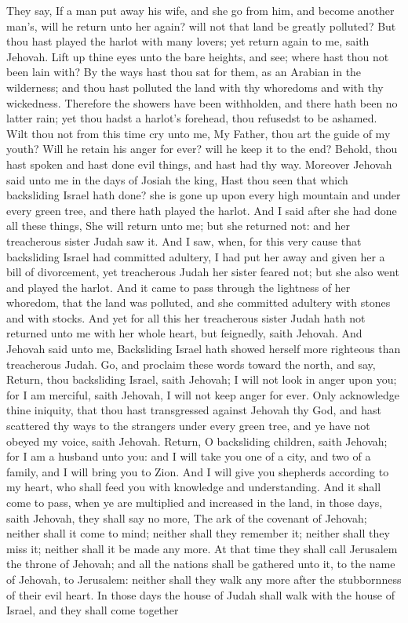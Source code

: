 They say, If a man put away his wife, and she go from him, and become another man’s, will he return unto her again? will not that land be greatly polluted? But thou hast played the harlot with many lovers; yet return again to me, saith Jehovah. Lift up thine eyes unto the bare heights, and see; where hast thou not been lain with? By the ways hast thou sat for them, as an Arabian in the wilderness; and thou hast polluted the land with thy whoredoms and with thy wickedness. Therefore the showers have been withholden, and there hath been no latter rain; yet thou hadst a harlot’s forehead, thou refusedst to be ashamed. Wilt thou not from this time cry unto me, My Father, thou art the guide of my youth? Will he retain his anger for ever? will he keep it to the end? Behold, thou hast spoken and hast done evil things, and hast had thy way.  Moreover Jehovah said unto me in the days of Josiah the king, Hast thou seen that which backsliding Israel hath done? she is gone up upon every high mountain and under every green tree, and there hath played the harlot. And I said after she had done all these things, She will return unto me; but she returned not: and her treacherous sister Judah saw it. And I saw, when, for this very cause that backsliding Israel had committed adultery, I had put her away and given her a bill of divorcement, yet treacherous Judah her sister feared not; but she also went and played the harlot. And it came to pass through the lightness of her whoredom, that the land was polluted, and she committed adultery with stones and with stocks. And yet for all this her treacherous sister Judah hath not returned unto me with her whole heart, but feignedly, saith Jehovah.  And Jehovah said unto me, Backsliding Israel hath showed herself more righteous than treacherous Judah. Go, and proclaim these words toward the north, and say, Return, thou backsliding Israel, saith Jehovah; I will not look in anger upon you; for I am merciful, saith Jehovah, I will not keep anger for ever. Only acknowledge thine iniquity, that thou hast transgressed against Jehovah thy God, and hast scattered thy ways to the strangers under every green tree, and ye have not obeyed my voice, saith Jehovah. Return, O backsliding children, saith Jehovah; for I am a husband unto you: and I will take you one of a city, and two of a family, and I will bring you to Zion. And I will give you shepherds according to my heart, who shall feed you with knowledge and understanding. And it shall come to pass, when ye are multiplied and increased in the land, in those days, saith Jehovah, they shall say no more, The ark of the covenant of Jehovah; neither shall it come to mind; neither shall they remember it; neither shall they miss it; neither shall it be made any more. At that time they shall call Jerusalem the throne of Jehovah; and all the nations shall be gathered unto it, to the name of Jehovah, to Jerusalem: neither shall they walk any more after the stubbornness of their evil heart. In those days the house of Judah shall walk with the house of Israel, and they shall come together 